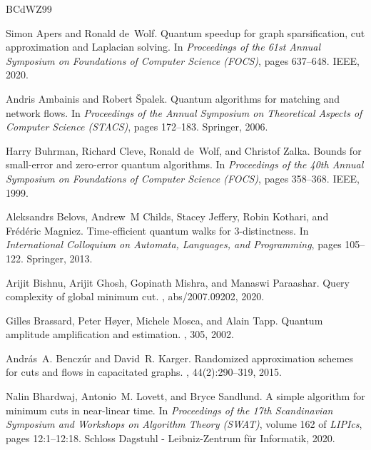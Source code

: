 \documentclass[10pt,a4paper]{article}
\newcommand{\1}{\mathbf{1}}
\theoremstyle{definition}
\begin{document}
\newcommand{\etalchar}[1]{$^{#1}$}
\begin{thebibliography}{BCdWZ99}

Simon Apers and Ronald de~Wolf.
\newblock Quantum speedup for graph sparsification, cut approximation and
  {L}aplacian solving.
\newblock In {\em Proceedings of the 61st Annual Symposium on Foundations of
  Computer Science (FOCS)}, pages 637--648. IEEE, 2020.

Andris Ambainis and Robert {\v{S}}palek.
\newblock Quantum algorithms for matching and network flows.
\newblock In {\em Proceedings of the Annual Symposium on Theoretical Aspects of
  Computer Science (STACS)}, pages 172--183. Springer, 2006.

Harry Buhrman, Richard Cleve, Ronald de~Wolf, and Christof Zalka.
\newblock Bounds for small-error and zero-error quantum algorithms.
\newblock In {\em Proceedings of the 40th Annual Symposium on Foundations of
  Computer Science (FOCS)}, pages 358--368. IEEE, 1999.

\bibitem[BCJ{\etalchar{+}}13]{B13}
Aleksandrs Belovs, Andrew~M Childs, Stacey Jeffery, Robin Kothari, and
  Fr{\'e}d{\'e}ric Magniez.
\newblock Time-efficient quantum walks for 3-distinctness.
\newblock In {\em International Colloquium on Automata, Languages, and
  Programming}, pages 105--122. Springer, 2013.

Arijit Bishnu, Arijit Ghosh, Gopinath Mishra, and Manaswi Paraashar.
\newblock Query complexity of global minimum cut.
, abs/2007.09202, 2020.

Gilles Brassard, Peter H{\o}yer, Michele Mosca, and Alain Tapp.
\newblock Quantum amplitude amplification and estimation.
, 305, 2002.

Andr{\'{a}}s~A. Bencz{\'{u}}r and David~R. Karger.
\newblock Randomized approximation schemes for cuts and flows in capacitated
  graphs.
, 44(2):290--319, 2015.

Nalin Bhardwaj, Antonio~M. Lovett, and Bryce Sandlund.
\newblock A simple algorithm for minimum cuts in near-linear time.
\newblock In {\em Proceedings of the 17th Scandinavian Symposium and Workshops
  on Algorithm Theory (SWAT)}, volume 162 of {\em LIPIcs}, pages 12:1--12:18.
  Schloss Dagstuhl - Leibniz-Zentrum f{\"{u}}r Informatik, 2020.
  

\end{thebibliography}
\end{document}
